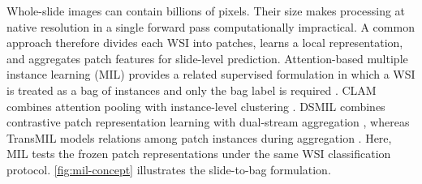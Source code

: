 \documentclass[conference,a4paper]{IEEEtran}
\begin{document}
Whole-slide images can contain billions of pixels. Their size makes processing
at native resolution in a single forward pass computationally impractical. A common approach therefore
divides each WSI into patches, learns a local representation, and aggregates
patch features for slide-level prediction. Attention-based multiple
instance learning (MIL) provides a related supervised formulation in which a
WSI is treated as a bag of instances and only the bag label is required
\cite{ilse_attention_2018}. CLAM combines attention pooling with instance-level
clustering \cite{lu_data_2021}. DSMIL combines contrastive patch representation
learning with dual-stream aggregation \cite{li_dualstream_2021}, whereas
TransMIL models relations among patch instances during aggregation
\cite{shao_transmil_2021}. Here, MIL tests the frozen patch representations under the same WSI
classification protocol. \autoref{fig:mil-concept} illustrates the slide-to-bag
formulation.
\end{document}
